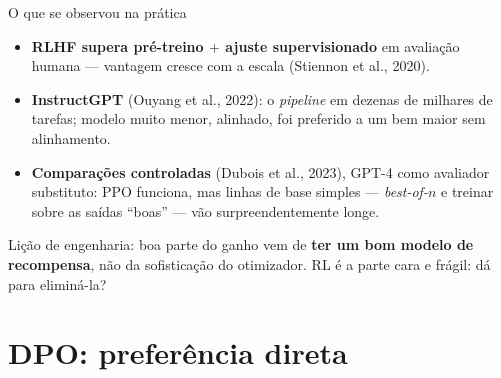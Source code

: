 \documentclass[aspectratio=169, 11pt]{beamer}
\begin{document}
\begin{frame}{O que se observou na prática}

  \begin{itemize}\setlength{\itemsep}{0.4ex}
    \item \textbf{RLHF supera pré-treino $+$ ajuste supervisionado} em avaliação
      humana --- vantagem cresce com a escala
      {\scriptsize(Stiennon et al., 2020)}.
    \item \textbf{InstructGPT} (Ouyang et al., 2022): o \emph{pipeline} em
      dezenas de milhares de tarefas; modelo muito menor, alinhado, foi
      preferido a um bem maior sem alinhamento.
    \item \textbf{Comparações controladas} (Dubois et al., 2023), GPT-4 como
      avaliador substituto: PPO funciona, mas linhas de base simples ---
      \emph{best-of-$n$} e treinar sobre as saídas ``boas'' --- vão
      surpreendentemente longe.
  \end{itemize}

  \begin{ideiabox}
    Lição de engenharia: boa parte do ganho vem de \textbf{ter um bom modelo de
    recompensa}, não da sofisticação do otimizador. RL é a parte cara e frágil:
    dá para eliminá-la?
  \end{ideiabox}
\end{frame}

\section{DPO: preferência direta}
\end{document}
